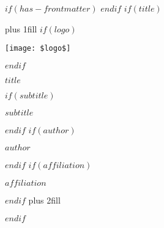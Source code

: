 $if(has-frontmatter)$
\frontmatter
$endif$
$if(title)$
\cleardoublepage
\thispagestyle{empty}
{\centering
\hbox{}\vskip 0cm plus 1fill
$if(logo)$
{\centering\texttt{[image: \$logo\$]}\par}
\vspace{3cm}
$endif$
{\Huge\bfseries $title$ \par}
$if(subtitle)$
\vspace{3ex}
{\huge\bfseries $subtitle$ \par}
$endif$
$if(author)$
\vspace{3ex}
{\Large\itshape $author$ \par}
$endif$
$if(affiliation)$
\vspace{3ex}
{\small $affiliation$ \par}
$endif$
\vskip 0cm plus 2fill
}
$endif$
